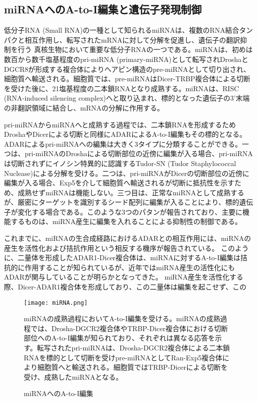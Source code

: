 \subsection{miRNAへのA-to-I編集と遺伝子発現制御}
低分子RNA (Small RNA)の一種として知られるmiRNAは、複数のRNA結合タンパクと相互作用し、転写されたmRNAに対して分解を促進し、遺伝子の翻訳抑制を行う
真核生物において重要な低分子RNAの一つである。miRNAは、初めは数百から数千塩基程度のpri-miRNA (primary-miRNA)として転写されDroshaとDGCR8が形成する複合体によりヘアピン構造のpre-miRNAとして切り出され、細胞質へ輸送される。細胞質では、pre-miRNAはDicer-TRBP複合体による切断を受けた後に、21塩基程度の二本鎖RNAとなり成熟する。miRNAは、RISC (RNA-induced silencing complex)へと取り込まれ、標的となった遺伝子の3'末端の非翻訳領域に結合し、mRNAの分解に作用する。
\par
pri-miRNAからmiRNAへと成熟する過程では、二本鎖RNAを形成するためDroshaやDicerによる切断と同様にADARによるA-to-I編集もその標的となる。ADARによるpri-miRNAへの編集は大きく3タイプに分類することができる。一つは、pri-miRNAのDroshaによる切断部位の近傍に編集が入る場合、pri-miRNAは切断されずにイノシン特異的に認識するTudor-SN (Tudor Staphylococcal
Nuclease)による分解を受ける。二つは、pri-miRNAがDicerの切断部位の近傍に編集が入る場合、Exp5を介して細胞質へ輸送されるが切断に抵抗性を示すため、成熟せずmiRNAは機能しない。三つ目は、正常なmiRNAとして成熟するが、厳密にターゲットを識別するシード配列に編集が入ることにより、標的遺伝子が変化する場合である。このような3つのパタンが報告されており、主要に機能するものは、miRNA産生に編集を入れることによる抑制性の制御である。
\par
これまでに、miRNAの生合成経路におけるADARとの相互作用には、miRNAの産生を活性化および拮抗作用という相反する機序が報告されている。
このように、二量体を形成したADAR1-Dicer複合体は、miRNAに対するA-to-I編集は拮抗的に作用することが知られているが、近年ではmiRNA産生の活性化にもADARが関与していることが明らかとなってきた。
miRNA産生を活性化する際、Dicer-ADAR1複合体を形成しており、この二量体は編集を起こせず、この

\begin{figure}[!htbp]
	\begin{center}
		\texttt{[image: miRNA.png]}
	\end{center}
	\caption{miRNAへのA-to-I編集}
	\begin{flushleft}
		\small{miRNAの成熟過程においてA-to-I編集を受ける。miRNAの成熟過程では、Drosha-DGCR2複合体やTRBP-Dicer複合体における切断部位へのA-to-I編集が知られており、それぞれは異なる応答を示す。転写されたpri-miRNAは、Drosha-DGCR2複合体による二本鎖RNAを標的として切断を受けpre-miRNAとしてRan-Exp5複合体により細胞質へと輸送される。細胞質ではTRBP-Dicerによる切断を受け、成熟したmiRNAとなる。}
	\end{flushleft}
	\label{fig:miRNA}
\end{figure}

